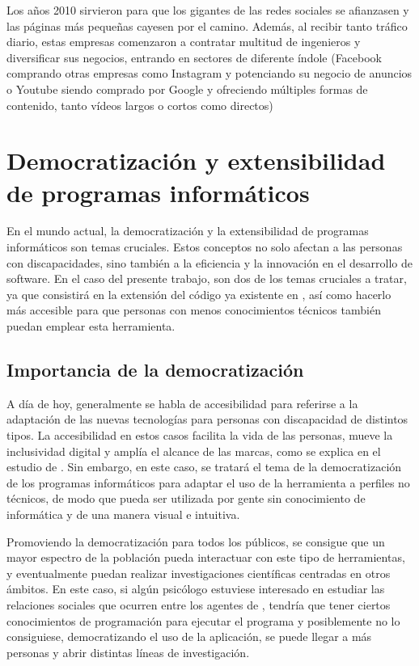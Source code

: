 Los años 2010 sirvieron para que los gigantes de las redes sociales se afianzasen y las páginas más pequeñas cayesen por el camino. Además, al recibir tanto tráfico diario, estas empresas comenzaron a contratar multitud de ingenieros y diversificar sus negocios, entrando en sectores de diferente índole (Facebook comprando otras empresas como Instagram y potenciando su negocio de anuncios o Youtube siendo comprado por Google y ofreciendo múltiples formas de contenido, tanto vídeos largos o cortos como directos)

\section{Democratización y extensibilidad de programas informáticos}

En el mundo actual, la democratización y la extensibilidad de programas informáticos son temas cruciales. Estos conceptos no solo afectan a las personas con discapacidades, sino también a la eficiencia y la innovación en el desarrollo de software. En el caso del presente trabajo, son dos de los temas cruciales a tratar, ya que consistirá en la extensión del código ya existente en \ga, así como hacerlo más accesible para que personas con menos conocimientos técnicos también puedan emplear esta herramienta.

\subsection{Importancia de la democratización}

A día de hoy, generalmente se habla de accesibilidad para referirse a la adaptación de las nuevas tecnologías para personas con discapacidad de distintos tipos. La accesibilidad en estos casos facilita la vida de las personas, mueve la inclusividad digital y amplía el alcance de las marcas, como se explica en el estudio de \citep{kavcic2005software}. Sin embargo, en este caso, se tratará el tema de la democratización de los programas informáticos para adaptar el uso de la herramienta a perfiles no técnicos, de modo que pueda ser utilizada por gente sin conocimiento de informática y de una manera visual e intuitiva.

Promoviendo la democratización para todos los públicos, se consigue que un mayor espectro de la población pueda interactuar con este tipo de herramientas, y eventualmente puedan realizar investigaciones científicas centradas en otros ámbitos. En este caso, si algún psicólogo estuviese interesado en estudiar las relaciones sociales que ocurren entre los agentes de \ga, tendría que tener ciertos conocimientos de programación para ejecutar el programa y posiblemente no lo consiguiese, democratizando el uso de la aplicación, se puede llegar a más personas y abrir distintas líneas de investigación.

